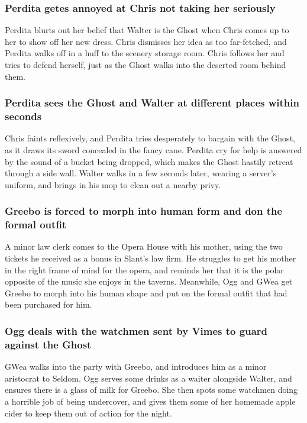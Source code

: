 \subsubsection{\Gls{Perdita} getes annoyed at \Gls{Chris} not taking her seriously}
\Gls{Perdita} blurts out her belief that \Gls{Walter} is the \Gls{Ghost} when \Gls{Chris} comes up
to her to show off her new dress. \Gls{Chris} dismisses her idea as too far-fetched, and
\Gls{Perdita} walks off in a huff to the scenery storage room. \Gls{Chris} follows her and tries to
defend herself, just as the \Gls{Ghost} walks into the deserted room behind them.

\subsubsection{\Gls{Perdita} sees the \Gls{Ghost} and \Gls{Walter} at different places within 
seconds}
\Gls{Chris} faints reflexively, and \Gls{Perdita} tries desperately to bargain with the \Gls{Ghost},
as it draws its sword concealed in the fancy cane. \Gls{Perdita} cry for help is answered by the 
sound of a bucket being dropped, which makes the \Gls{Ghost} hastily retreat through a side wall. 
\Gls{Walter} walks in a few seconds later, wearing a server's uniform, and brings in his mop to 
clean out a nearby privy.

\subsubsection{\Gls{Greebo} is forced to morph into human form and don the formal outfit}
A minor law clerk comes to the Opera House with his mother, using the two tickets he received as a 
bonus in \Gls{Slant}'s law firm. He struggles to get his mother in the right frame of mind for the 
opera, and reminds her that it is the polar opposite of the music she enjoys in the taverns. 
Meanwhile, \Gls{Ogg} and \Gls{GWea} get \Gls{Greebo} to morph into his human shape and put on the 
formal outfit that had been purchased for him.

\subsubsection{\Gls{Ogg} deals with the watchmen sent by \Gls{Vimes} to guard against the
\Gls{Ghost}}
\Gls{GWea} walks into the party with \Gls{Greebo}, and introduces him as a minor aristocrat to 
\Gls{Seldom}. \Gls{Ogg} serves some drinks as a waiter alongside \Gls{Walter}, and ensures there is 
a glass of milk for \Gls{Greebo}. She then spots some watchmen doing a horrible job of being 
undercover, and gives them some of her homemade apple cider to keep them out of action for the 
night.

